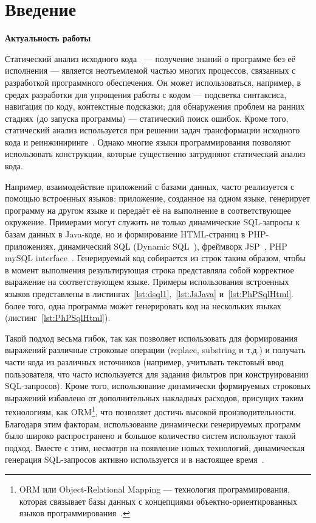 \chapter*{Введение}                         %
\textbf{Актуальность работы}

Статический анализ исходного кода~\cite{StaticCodeAnalysis3,StaticCodeAnalysis2,StaticCodeAnalysis1} --- получение знаний о программе без её исполнения --- является неотъемлемой частью многих процессов, связанных с разработкой программного обеспечения. Он может использоваться, например, в средах разработки для упрощения работы с кодом --- подсветка синтаксиса, навигация по коду, контекстные подсказки; для обнаружения проблем на ранних стадиях (до запуска программы) --- статический поиск ошибок.  Кроме того, статический анализ используется при решении задач трансформации исходного кода и реинжиниринге~\cite{reengANT}. Однако многие языки программирования позволяют использовать конструкции, которые существенно затрудняют статический анализ кода.

Например, взаимодействие приложений с базами данных, часто реализуется с помощью встроенных языков: приложение, созданное на одном языке, генерирует программу на другом языке и передаёт её на выполнение в соответствующее окружение. Примерами могут служить не только динамические SQL-запросы к базам данных в Java-коде, но и формирование HTML-страниц в PHP-приложениях, динамический SQL (Dynamic SQL~\cite{DSQLISO}), фреймворк JSP~\cite{JSP}, PHP mySQL interface~\cite{PHPmySQL}. Генерируемый код собирается из строк таким образом, чтобы в момент выполнения результирующая строка представляла собой корректное выражение на соответствующем языке. Примеры использования встроенных языков представлены в листингах~\ref{lst:dsql1},~\ref{lst:JsJava} и~\ref{lst:PhPSqlHtml}. более того, одна программа может генерировать код на нескольких языках (листинг~\ref{lst:PhPSqlHtml}).

Такой подход весьма гибок, так как позволяет использовать для формирования выражений различные строковые операции (replace, substring и т.д.) и получать части кода из различных источников (например, учитывать текстовый ввод пользователя, что часто используется для задания фильтров при конструировании SQL-запросов). Кроме того, использование динамически формируемых строковых выражений избавлено от  дополнительных накладных расходов, присущих таким технологиям, как ORM\footnote{ORM или Object-Relational Mapping --- технология программирования, которая связывает базы данных с концепциями объектно-ориентированных языков программирования~\cite{ORM}.}, что позволяет достичь высокой производительности. Благодаря этим факторам, использование динамически генерируемых программ было широко распространено и большое количество систем используют такой подход. Вместе с этим, несмотря на появление новых технологий, динамическая генерация SQL-запросов активно используется и в настоящее время~\cite{DSQLInActiveUse}.

